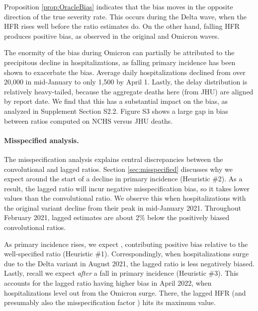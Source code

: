\documentclass{article}
\begin{document}
Proposition \ref{prop:OracleBias} indicates that the bias moves in the opposite
direction of the true severity rate. This occurs during the Delta wave, when the
HFR rises well before the ratio estimates do. On the other hand, falling HFR
produces positive bias, as observed in the original and Omicron waves.  

The enormity of the bias during Omicron can partially be attributed to the
precipitous decline in hospitalizations, as falling primary incidence has been
shown to exacerbate the bias. Average daily hospitalizations declined from over
20,000 in mid-January to only 1,500 by April 1. Lastly, the delay distribution
is relatively heavy-tailed, because the aggregate deaths here (from JHU) are
aligned by report date. 
We find that this has a substantial impact on the bias, 
as analyzed in Supplement Section S2.2. 
Figure S3 shows a large gap in bias between ratios computed on NCHS versus JHU deaths.

\paragraph{Misspecified analysis.}

The misspecification analysis explains central discrepancies between the
convolutional and lagged ratios. Section \ref{sec:misspecified} discusses why we 
expect  around the start of a decline in primary
incidence (Heuristic \#2). As a result, the lagged ratio will incur negative misspecification
bias, so it takes lower values than the convolutional ratio. 
We observe this when hospitalizations with the original variant
decline from their peak in mid-January 2021. Throughout February 2021, lagged
estimates are about 2\% below the positively biased convolutional ratios.   

As primary incidence rises, we expect , contributing
positive bias relative to the well-specified
ratio (Heuristic \#1). Correspondingly, when hospitalizations surge due to the Delta variant in 
August 2021, the lagged ratio is less negatively biased. Lastly, recall we
expect  \emph{after} a fall in primary incidence (Heuristic \#3). This
accounts for the lagged ratio having higher bias in April 2022, when
hospitalizations level out from the Omicron surge. There, the lagged HFR (and 
presumably also the misspecification factor ) hits its maximum
value.   

\paragraph{}
\end{document}
